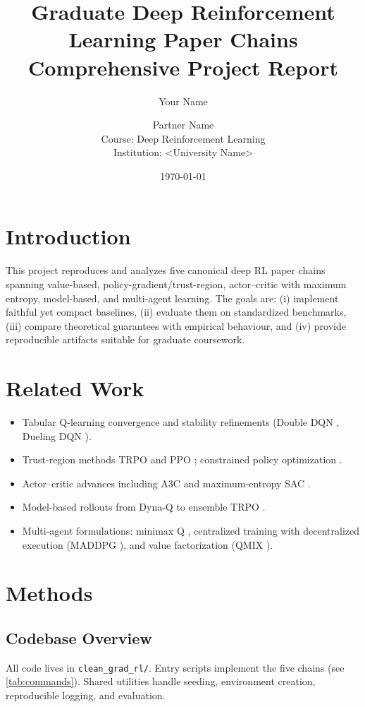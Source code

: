 \documentclass[12pt]{article}
\title{Graduate Deep Reinforcement Learning Paper Chains\\Comprehensive Project Report}
\author{Your Name \and Partner Name\\Course: Deep Reinforcement Learning\\Institution: <University Name>}
\date{\today}
\newcommand{\code}[1]{\texttt{#1}}
\begin{document}
\maketitle
\tableofcontents
\listoftables
\listoffigures

\section{Introduction}
This project reproduces and analyzes five canonical deep RL paper chains spanning value-based, policy-gradient/trust-region, actor--critic with maximum entropy, model-based, and multi-agent learning. The goals are: (i) implement faithful yet compact baselines, (ii) evaluate them on standardized benchmarks, (iii) compare theoretical guarantees with empirical behaviour, and (iv) provide reproducible artifacts suitable for graduate coursework.

\section{Related Work}
\begin{itemize}[leftmargin=*]
    \item Tabular Q-learning convergence \cite{watkins1992} and stability refinements (Double DQN \cite{vanhasselt2016double}, Dueling DQN \cite{wang2016dueling}).
    \item Trust-region methods TRPO \cite{schulman2015trpo} and PPO \cite{schulman2017ppo}; constrained policy optimization \cite{achiam2017cpo}.
    \item Actor--critic advances including A3C \cite{mnih2016a3c} and maximum-entropy SAC \cite{haarnoja2018sac}.
    \item Model-based rollouts from Dyna-Q \cite{sutton1990dyna} to ensemble TRPO \cite{kurutach2018metrpo}.
    \item Multi-agent formulations: minimax Q \cite{littman1994}, centralized training with decentralized execution (MADDPG \cite{lowe2017maddpg}), and value factorization (QMIX \cite{rashid2018qmix}).
\end{itemize}

\section{Methods}
\subsection{Codebase Overview}
All code lives in \code{clean\_grad\_rl/}. Entry scripts implement the five chains (see \cref{tab:commands}). Shared utilities handle seeding, environment creation, reproducible logging, and evaluation.
\end{document}
